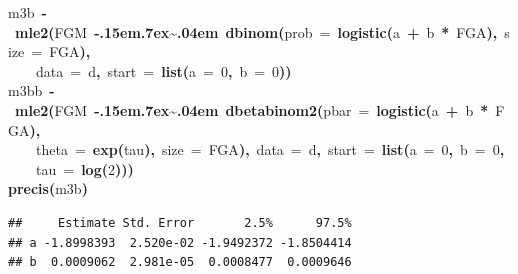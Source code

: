 \documentclass{article}
\makeatletter
\newcommand{\hlnumber}[1]{\textcolor[rgb]{0,0,0}{#1}}%
\newcommand{\hlfunctioncall}[1]{\textcolor[rgb]{.5,0,.33}{\textbf{#1}}}%
\newcommand{\hlkeyword}[1]{\textbf{#1}}%
\newcommand{\hlargument}[1]{\textcolor[rgb]{.69,.25,.02}{#1}}%
\newcommand{\hlassignement}[1]{\textbf{#1}}%
\newcommand{\hlsymbol}[1]{#1}%
\def\urltilda{\kern -.15em\lower .7ex\hbox{\~{}}\kern .04em}%
\newcommand{\hlstd}[1]{\textcolor[rgb]{0,0,0}{#1}}%
\newenvironment{kframe}{%
 \def\FrameCommand##1{\hskip\@totalleftmargin \hskip-\fboxsep
 \colorbox{shadecolor}{##1}\hskip-\fboxsep
     \hskip-\linewidth \hskip-\@totalleftmargin \hskip\columnwidth}%
 \MakeFramed {\advance\hsize-\width
   \@totalleftmargin\z@ \linewidth\hsize
   \@setminipage}}%
 {\par\unskip\endMakeFramed}
\newenvironment{knitrout}{}{} %
\makeatother
\begin{document}
\begin{knitrout}
{\begin{kframe}
\begin{flushleft}
\hlstd{}\hlsymbol{m3b}{\ }\hlassignement{\usebox{\hlnormalsizeboxlessthan}-}{\ }\hlfunctioncall{mle2}\hlkeyword{(}\hlsymbol{FGM}{\ }\hlkeyword{\urltilda{}}{\ }\hlfunctioncall{dbinom}\hlkeyword{(}\hlargument{prob}{\ }\hlargument{=}{\ }\hlfunctioncall{logistic}\hlkeyword{(}\hlsymbol{a}{\ }\hlkeyword{+}{\ }\hlsymbol{b}{\ }\hlkeyword{*}{\ }\hlsymbol{FGA}\hlkeyword{)}\hlkeyword{,}{\ }\hlargument{size}{\ }\hlargument{=}{\ }\hlsymbol{FGA}\hlkeyword{)}\hlkeyword{,}\hspace*{\fill}\\
\hlstd{}{\ }{\ }{\ }{\ }\hlargument{data}{\ }\hlargument{=}{\ }\hlsymbol{d}\hlkeyword{,}{\ }\hlargument{start}{\ }\hlargument{=}{\ }\hlfunctioncall{list}\hlkeyword{(}\hlargument{a}{\ }\hlargument{=}{\ }\hlnumber{0}\hlkeyword{,}{\ }\hlargument{b}{\ }\hlargument{=}{\ }\hlnumber{0}\hlkeyword{)}\hlkeyword{)}\hspace*{\fill}\\
\hlstd{}\hlsymbol{m3bb}{\ }\hlassignement{\usebox{\hlnormalsizeboxlessthan}-}{\ }\hlfunctioncall{mle2}\hlkeyword{(}\hlsymbol{FGM}{\ }\hlkeyword{\urltilda{}}{\ }\hlfunctioncall{dbetabinom2}\hlkeyword{(}\hlargument{pbar}{\ }\hlargument{=}{\ }\hlfunctioncall{logistic}\hlkeyword{(}\hlsymbol{a}{\ }\hlkeyword{+}{\ }\hlsymbol{b}{\ }\hlkeyword{*}{\ }\hlsymbol{FGA}\hlkeyword{)}\hlkeyword{,}\hspace*{\fill}\\
\hlstd{}{\ }{\ }{\ }{\ }\hlargument{theta}{\ }\hlargument{=}{\ }\hlfunctioncall{exp}\hlkeyword{(}\hlsymbol{tau}\hlkeyword{)}\hlkeyword{,}{\ }\hlargument{size}{\ }\hlargument{=}{\ }\hlsymbol{FGA}\hlkeyword{)}\hlkeyword{,}{\ }\hlargument{data}{\ }\hlargument{=}{\ }\hlsymbol{d}\hlkeyword{,}{\ }\hlargument{start}{\ }\hlargument{=}{\ }\hlfunctioncall{list}\hlkeyword{(}\hlargument{a}{\ }\hlargument{=}{\ }\hlnumber{0}\hlkeyword{,}{\ }\hlargument{b}{\ }\hlargument{=}{\ }\hlnumber{0}\hlkeyword{,}\hspace*{\fill}\\
\hlstd{}{\ }{\ }{\ }{\ }\hlargument{tau}{\ }\hlargument{=}{\ }\hlfunctioncall{log}\hlkeyword{(}\hlnumber{2}\hlkeyword{)}\hlkeyword{)}\hlkeyword{)}\hspace*{\fill}\\
\hlstd{}\hlfunctioncall{precis}\hlkeyword{(}\hlsymbol{m3b}\hlkeyword{)}\mbox{}
\normalfont
\end{flushleft}
\begin{verbatim}
##     Estimate Std. Error       2.5%      97.5%
## a -1.8998393  2.520e-02 -1.9492372 -1.8504414
## b  0.0009062  2.981e-05  0.0008477  0.0009646

\end{verbatim}
\end{kframe}}
\end{knitrout}
\end{document}
